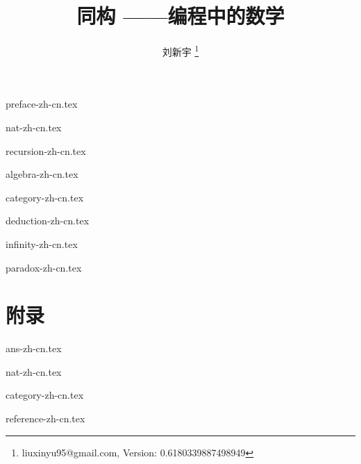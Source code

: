 \documentclass[zihao=5, b5paper, twoside, table, heading=true, punct=kaiming]{ctexbook}
\begin{document}



\title{
  {\bf \Huge 同构 \newline}
  \vspace{5mm}
  {\bf ——编程中的数学 \newline \newline \newline}
  \centering
}

\author{刘新宇
  \thanks{ liuxinyu95@gmail.com, Version: 0.6180339887498949}
}

\maketitle

\frontmatter
{preface-zh-cn.tex}
\newpage

\tableofcontents

\mainmatter

{nat-zh-cn.tex}

{recursion-zh-cn.tex}

{algebra-zh-cn.tex}

{category-zh-cn.tex}

{deduction-zh-cn.tex}

{infinity-zh-cn.tex}

{paradox-zh-cn.tex}

\part*{附录}
\appendix
\noappendicestocpagenum
\addappheadtotoc

\backmatter
{ans-zh-cn.tex}

{nat-zh-cn.tex}

{category-zh-cn.tex}

{reference-zh-cn.tex}

\printindex

%
\end{document}

